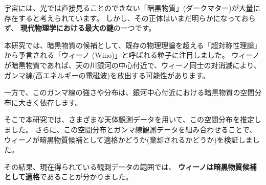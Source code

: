 宇宙には、光では直接見ることのできない「暗黒物質」(ダークマター)が大量に存在すると考えられています。
しかし、その正体はいまだ明らかになっておらず、 \textbf{現代物理学における最大の謎}の一つです。

本研究では、暗黒物質の候補として、既存の物理理論を超える「超対称性理論」から予言される「ウィーノ (Wino)」と呼ばれる粒子に注目しました。
ウィーノが暗黒物質であれば、天の川銀河の中心付近で、ウィーノ同士の対消滅により、ガンマ線(高エネルギーの電磁波)を放出する可能性があります。

一方で、このガンマ線の強さや分布は、銀河中心付近における暗黒物質の空間分布に大きく依存します。

そこで本研究では、さまざまな天体観測データを用いて、この空間分布を推定しました。
さらに、この空間分布とガンマ線観測データを組み合わせることで、ウィーノが暗黒物質候補として適格かどうか(棄却されるかどうか)を検証しました。

その結果、現在得られている観測データの範囲では、 \textbf{ウィーノは暗黒物質候補として適格}であることが分かりました。

